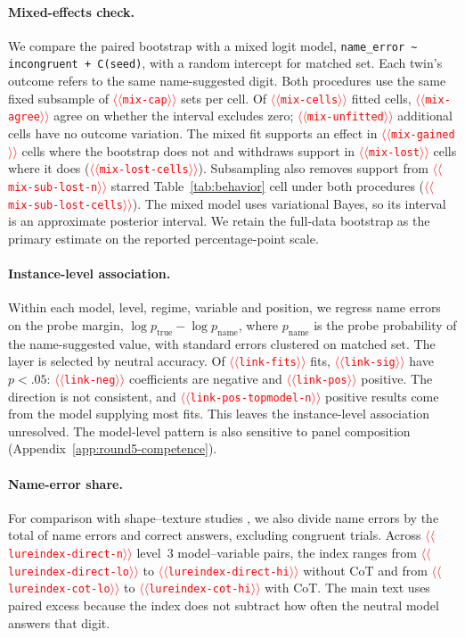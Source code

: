 \documentclass[11pt]{article}
\providecommand{\NUM}[1]{\textcolor{red}{$\langle\langle$\texttt{#1}$\rangle\rangle$}}
\begin{document}
\paragraph{Mixed-effects check.} We compare the paired bootstrap with a mixed logit model,
\texttt{name\_error \textasciitilde{} incongruent + C(seed)}, with a random intercept for
matched set. Each twin's outcome refers to the same name-suggested digit. Both procedures use the same
fixed subsample of \NUM{mix-cap} sets per cell. Of \NUM{mix-cells} fitted cells,
\NUM{mix-agree} agree on whether the interval excludes zero; \NUM{mix-unfitted} additional
cells have no outcome variation. The mixed fit supports an effect in \NUM{mix-gained} cells
where the bootstrap does not and withdraws support in \NUM{mix-lost} cells where it does
(\NUM{mix-lost-cells}). Subsampling also removes support from \NUM{mix-sub-lost-n} starred
Table~\ref{tab:behavior} cell under both procedures (\NUM{mix-sub-lost-cells}). The mixed
model uses variational Bayes, so its interval is an approximate posterior interval. We retain
the full-data bootstrap as the primary estimate on the reported percentage-point scale.

\paragraph{Instance-level association.} Within each model, level, regime, variable and
position, we regress name errors on the probe margin, $\log p_{\mathrm{true}}-\log p_{\mathrm{name}}$,
where $p_{\mathrm{name}}$ is the probe probability of the name-suggested value,
with standard errors clustered on matched set. The layer is selected by neutral accuracy.
Of \NUM{link-fits} fits, \NUM{link-sig} have $p<.05$: \NUM{link-neg} coefficients are negative
and \NUM{link-pos} positive. The direction is not consistent, and \NUM{link-pos-topmodel-n}
positive results come from the model supplying most fits. This leaves the instance-level
association unresolved. The model-level pattern is also sensitive to panel composition
(Appendix~\ref{app:round5-competence}).

\paragraph{Name-error share.} For comparison with shape--texture studies \cite{geirhos2019texture},
we also divide name errors by the total of name errors and correct answers, excluding congruent trials.
Across \NUM{lureindex-direct-n} level~3 model--variable pairs, the index ranges from
\NUM{lureindex-direct-lo} to \NUM{lureindex-direct-hi} without CoT and from
\NUM{lureindex-cot-lo} to \NUM{lureindex-cot-hi} with CoT. The main text uses paired excess
because the index does not subtract how often the neutral model answers that digit.
\end{document}

